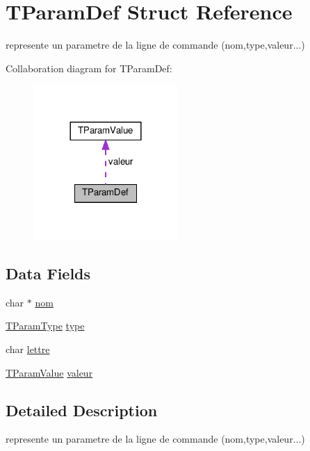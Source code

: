 \hypertarget{structTParamDef}{}\section{T\+Param\+Def Struct Reference}
\label{structTParamDef}


represente un parametre de la ligne de commande (nom,type,valeur...)  




Collaboration diagram for T\+Param\+Def\+:\nopagebreak
\begin{figure}[H]
\begin{center}
\leavevmode
\includegraphics[width=156pt]{structTParamDef__coll__graph}
\end{center}
\end{figure}
\subsection*{Data Fields}
\begin{DoxyCompactItemize}
\item 
char $\ast$ \hyperlink{structTParamDef_afa78db012abc7fecd18c60d6154e04f8}{nom}
\item 
\hyperlink{main_8c_a07d4e5a29d675892ddc5f377533c06a5}{T\+Param\+Type} \hyperlink{structTParamDef_aaa8c69f39c6dd02a968dc15044810327}{type}
\item 
char \hyperlink{structTParamDef_a66254f6368c5542d3f14afdd1ea1e621}{lettre}
\item 
\hyperlink{unionTParamValue}{T\+Param\+Value} \hyperlink{structTParamDef_a3f5cbf75e393d35bb230dfe293f7c7ba}{valeur}
\end{DoxyCompactItemize}


\subsection{Detailed Description}
represente un parametre de la ligne de commande (nom,type,valeur...) 

